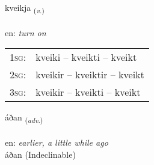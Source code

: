 \documentclass[frontgrid, backgrid]{flacards}\usepackage[]{graphicx}\usepackage[]{color}
\begin{document}
\renewcommand{\blhead}{\vskip5pt {\small\bfseries\footnotesize Sagnorð | Verb }}
\renewcommand{\bcfoot}{\vskip5pt \hspace{2pt}{\small\bfseries\footnotesize 2K}}


{kveikja \small{\textsubscript{(\textit{v.})}} \\[1ex] %
\textphonetic{[kʰveiːca]} \\
en: \emph{turn on} \\  [2ex]
\renewcommand*{\arraystretch}{0.8}
\begin{tabular}{p{1cm}l}
\textsc{1sg}: & kveiki -- kveikti -- kveikt \\ 
\textsc{2sg}: & kveikir -- kveiktir -- kveikt \\ 
\textsc{3sg}: & kveikir -- kveikti -- kveikt \\ 
\end{tabular}
}


\renewcommand{\flhead}{\vskip5pt \fboxsep=0pt {\small\bfseries\footnotesize Atviksorð | Adverb}}
\renewcommand{\fcfoot}{\vskip5pt \fboxsep=0pt \hspace{2pt}{\small\bfseries\footnotesize 2K}}

\renewcommand{\blhead}{\vskip5pt {\small\bfseries\footnotesize Atviksorð | Adverb }}
\renewcommand{\bcfoot}{\vskip5pt \hspace{2pt}{\small\bfseries\footnotesize 2K}}


{áðan \small{\textsubscript{(\textit{adv.})}} \\[1ex]
\textphonetic{[auːðan]} \\
en: \emph{earlier, a little while ago} \\  [2ex]
áðan (Indeclinable)}

\renewcommand{\flhead}{\vskip5pt \fboxsep=0pt {\small\bfseries\footnotesize Nafnorð | Noun}}
\renewcommand{\fcfoot}{\vskip5pt \fboxsep=0pt \hspace{2pt}{\small\bfseries\footnotesize 2K}}

\renewcommand{\blhead}{\vskip5pt {\small\bfseries\footnotesize Nafnorð | Noun }}
\renewcommand{\bcfoot}{\vskip5pt \hspace{2pt}{\small\bfseries\footnotesize 2K}}
\end{document}
